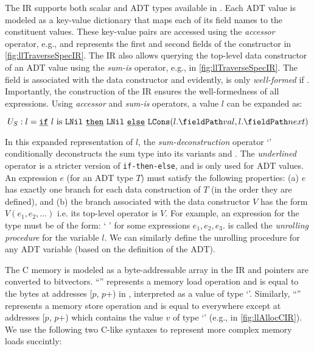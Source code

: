 The IR supports both scalar and ADT types available in \SpecL{}.
Each ADT value is modeled as a key-value dictionary that maps
each of its field names to the constituent values.
These key-value pairs are accessed using the {\em accessor} operator,
e.g.,  and  represents the first and second
fields of the  constructor in \cref{fig:llTraverseSpecIR}.
The IR also allows querying the top-level data constructor of an ADT value
using the {\em sum-is} operator, e.g.,  in \cref{fig:llTraverseSpecIR}.
The  field is associated with the  data constructor
and evidently,  is only {\em well-formed} if .
Importantly, the construction of the \SpecL{} IR ensures the well-formedness of all expressions.
Using {\em accessor} and {\em sum-is} operators, a  value $l$ can be expanded as:

\begin{equation}
\label{eqn:specDeconstruct}
U_S: l = \sumIf{\sumIs{l}{LNil}} \  \sumThen{\cons{LNil}} \  \sumElse{\cons{LCons}(\prodAccess{l}{val}, \prodAccess{l}{next})}
\end{equation}

In this expanded representation of $l$,
the {\em sum-deconstruction} operator `\sumDtor{}'
conditionally deconstructs the sum type into its variants  and .
The {\em underlined} \sumDtor{} operator is a stricter version of {\tt if-then-else}, and is only used for ADT values.
An \sumDtor{} expression $e$ (for an ADT type $T$) must satisfy the following properties:
(a) $e$ has exactly one branch for each data construction of $T$ (in the order they are defined),
and (b) the branch associated with the data constructor $V$ has the form $V(e_1,e_2,\dots)$ i.e. its top-level operator is $V$.
For example, an \sumDtor{} expression for the  type must be of the form:
`  ' for some expressions $e_1,e_2,e_3$.
 is called the {\em unrolling procedure} for the  variable $l$.
We can similarly define the unrolling procedure for any ADT variable (based on the definition of the ADT).

The C memory is modeled as a byte-addressable array \mem{} in the IR
and pointers are converted to bitvectors.
``'' represents a memory load operation and is equal to the bytes
at addresses [$p$, $p$+) in \mem{}, interpreted as a value of type `'.
Similarly, ``'' represents a memory store operation and is equal to \mem{}
everywhere except at addresses [$p$, $p$+) which contains
the value $v$ of type `' (e.g.,  in \cref{fig:llAllocCIR}).
We use the following two C-like syntaxes to represent more complex memory loads succintly:


